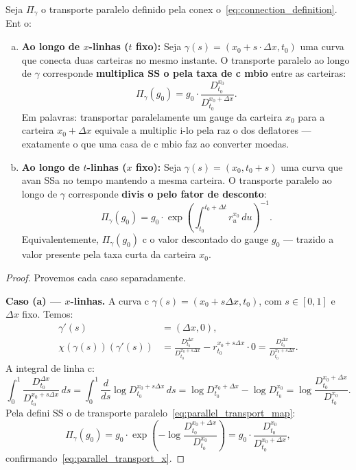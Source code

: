 {\begin{teo}\label{teo:financial_interpretation}
Seja $\Pi_\gamma$ o transporte paralelo definido pela
conex o~\eqref{eq:connection_definition}. Ent o:

\begin{enumerate}[(a)]
 \item \textbf{Ao longo de $x$-linhas ($t$ fixo):}
 Seja $\gamma(s) = (x_0 + s \cdot \Delta x, t_0)$ uma curva que
 conecta duas carteiras no mesmo instante. O transporte
 paralelo ao longo de $\gamma$ corresponde 
 \textbf{multiplica SS o pela taxa de c mbio} entre as carteiras:
 \begin{equation}\label{eq:parallel_transport_x}
 \Pi_\gamma(g_0) = g_0 \cdot \frac{D_{t_0}^{x_0}}{D_{t_0}^{x_0 + \Delta x}}.
 \end{equation}
 Em palavras: transportar paralelamente um gauge da carteira
 $x_0$ para a carteira $x_0 + \Delta x$ equivale a multiplic i-lo
 pela raz o dos deflatores --- exatamente o que uma casa de
 c mbio faz ao converter moedas.

 \item \textbf{Ao longo de $t$-linhas ($x$ fixo):}
 Seja $\gamma(s) = (x_0, t_0 + s)$ uma curva que avan SSa no
 tempo mantendo a mesma carteira. O transporte paralelo ao
 longo de $\gamma$ corresponde \textbf{divis o pelo fator de
 desconto}:
 \begin{equation}\label{eq:parallel_transport_t}
 \Pi_\gamma(g_0) = g_0 \cdot \exp\left(\int_{t_0}^{t_0 + \Delta t} r_u^{x_0}\,du\right)^{-1}.
 \end{equation}
 Equivalentemente, $\Pi_\gamma(g_0)$ c o valor descontado do
 gauge $g_0$ --- trazido a valor presente pela taxa curta da
 carteira $x_0$.
\end{enumerate}
\end{teo}

\begin{proof}
Provemos cada caso separadamente.

\textbf{Caso (a) --- $x$-linhas.} A curva c $\gamma(s) = (x_0 + s
\Delta x, t_0)$, com $s \in [0,1]$ e $\Delta x$ fixo. Temos:
\begin{align*}
 \gamma'(s) &= (\Delta x, 0), \\
 \chi(\gamma(s))(\gamma'(s))
 &= \frac{D_{t_0}^{\Delta x}}{D_{t_0}^{x_0 + s\Delta x}} - r_{t_0}^{x_0 + s\Delta x} \cdot 0
 = \frac{D_{t_0}^{\Delta x}}{D_{t_0}^{x_0 + s\Delta x}}.
\end{align*}
A integral de linha c:
\[
\int_0^1 \frac{D_{t_0}^{\Delta x}}{D_{t_0}^{x_0 + s\Delta x}}\,ds
= \int_0^1 \frac{d}{ds}\log D_{t_0}^{x_0 + s\Delta x}\,ds
= \log D_{t_0}^{x_0 + \Delta x} - \log D_{t_0}^{x_0}
= \log\frac{D_{t_0}^{x_0 + \Delta x}}{D_{t_0}^{x_0}}.
\]
Pela defini SS o de transporte paralelo~\eqref{eq:parallel_transport_map}:
\[
\Pi_\gamma(g_0) = g_0 \cdot \exp\!\left(-\log\frac{D_{t_0}^{x_0 + \Delta x}}{D_{t_0}^{x_0}}\right)
= g_0 \cdot \frac{D_{t_0}^{x_0}}{D_{t_0}^{x_0 + \Delta x}},
\]
confirmando~\eqref{eq:parallel_transport_x}.


\end{proof}}
